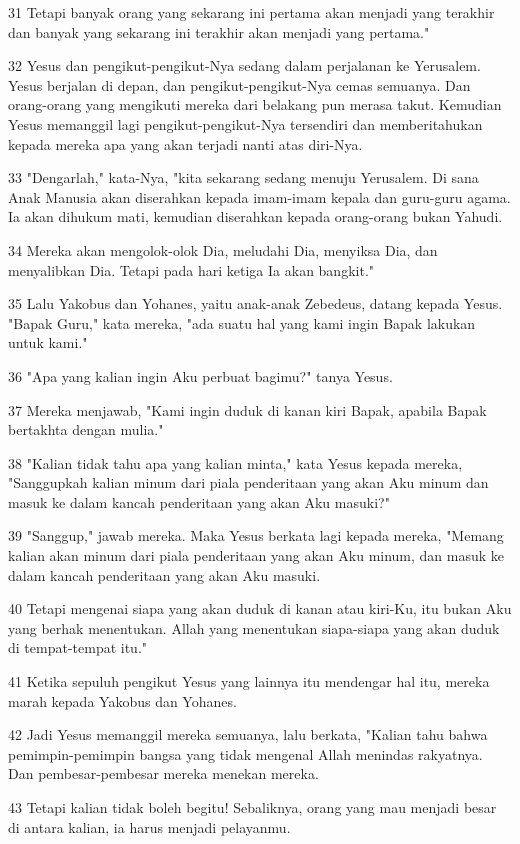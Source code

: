 \par 31 Tetapi banyak orang yang sekarang ini pertama akan menjadi yang terakhir dan banyak yang sekarang ini terakhir akan menjadi yang pertama."
\par 32 Yesus dan pengikut-pengikut-Nya sedang dalam perjalanan ke Yerusalem. Yesus berjalan di depan, dan pengikut-pengikut-Nya cemas semuanya. Dan orang-orang yang mengikuti mereka dari belakang pun merasa takut. Kemudian Yesus memanggil lagi pengikut-pengikut-Nya tersendiri dan memberitahukan kepada mereka apa yang akan terjadi nanti atas diri-Nya.
\par 33 "Dengarlah," kata-Nya, "kita sekarang sedang menuju Yerusalem. Di sana Anak Manusia akan diserahkan kepada imam-imam kepala dan guru-guru agama. Ia akan dihukum mati, kemudian diserahkan kepada orang-orang bukan Yahudi.
\par 34 Mereka akan mengolok-olok Dia, meludahi Dia, menyiksa Dia, dan menyalibkan Dia. Tetapi pada hari ketiga Ia akan bangkit."
\par 35 Lalu Yakobus dan Yohanes, yaitu anak-anak Zebedeus, datang kepada Yesus. "Bapak Guru," kata mereka, "ada suatu hal yang kami ingin Bapak lakukan untuk kami."
\par 36 "Apa yang kalian ingin Aku perbuat bagimu?" tanya Yesus.
\par 37 Mereka menjawab, "Kami ingin duduk di kanan kiri Bapak, apabila Bapak bertakhta dengan mulia."
\par 38 "Kalian tidak tahu apa yang kalian minta," kata Yesus kepada mereka, "Sanggupkah kalian minum dari piala penderitaan yang akan Aku minum dan masuk ke dalam kancah penderitaan yang akan Aku masuki?"
\par 39 "Sanggup," jawab mereka. Maka Yesus berkata lagi kepada mereka, "Memang kalian akan minum dari piala penderitaan yang akan Aku minum, dan masuk ke dalam kancah penderitaan yang akan Aku masuki.
\par 40 Tetapi mengenai siapa yang akan duduk di kanan atau kiri-Ku, itu bukan Aku yang berhak menentukan. Allah yang menentukan siapa-siapa yang akan duduk di tempat-tempat itu."
\par 41 Ketika sepuluh pengikut Yesus yang lainnya itu mendengar hal itu, mereka marah kepada Yakobus dan Yohanes.
\par 42 Jadi Yesus memanggil mereka semuanya, lalu berkata, "Kalian tahu bahwa pemimpin-pemimpin bangsa yang tidak mengenal Allah menindas rakyatnya. Dan pembesar-pembesar mereka menekan mereka.
\par 43 Tetapi kalian tidak boleh begitu! Sebaliknya, orang yang mau menjadi besar di antara kalian, ia harus menjadi pelayanmu.
